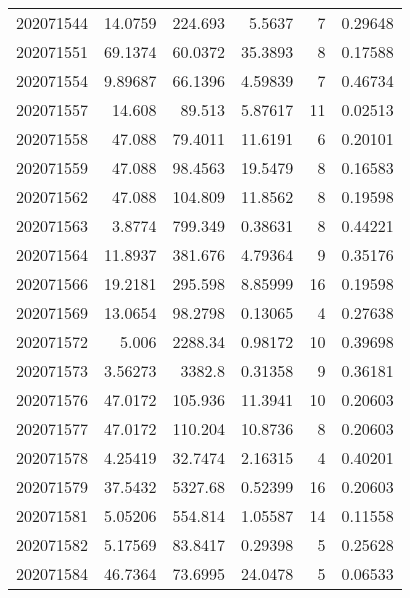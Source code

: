 \begin{tabular}{rrrrrr}
 202071544 &         14.0759  &      224.693  &            5.5637  &           7 & 0.29648 \\
 202071551 &         69.1374  &       60.0372 &           35.3893  &           8 & 0.17588 \\
 202071554 &          9.89687 &       66.1396 &            4.59839 &           7 & 0.46734 \\
 202071557 &         14.608   &       89.513  &            5.87617 &          11 & 0.02513 \\
 202071558 &         47.088   &       79.4011 &           11.6191  &           6 & 0.20101 \\
 202071559 &         47.088   &       98.4563 &           19.5479  &           8 & 0.16583 \\
 202071562 &         47.088   &      104.809  &           11.8562  &           8 & 0.19598 \\
 202071563 &          3.8774  &      799.349  &            0.38631 &           8 & 0.44221 \\
 202071564 &         11.8937  &      381.676  &            4.79364 &           9 & 0.35176 \\
 202071566 &         19.2181  &      295.598  &            8.85999 &          16 & 0.19598 \\
 202071569 &         13.0654  &       98.2798 &            0.13065 &           4 & 0.27638 \\
 202071572 &          5.006   &     2288.34   &            0.98172 &          10 & 0.39698 \\
 202071573 &          3.56273 &     3382.8    &            0.31358 &           9 & 0.36181 \\
 202071576 &         47.0172  &      105.936  &           11.3941  &          10 & 0.20603 \\
 202071577 &         47.0172  &      110.204  &           10.8736  &           8 & 0.20603 \\
 202071578 &          4.25419 &       32.7474 &            2.16315 &           4 & 0.40201 \\
 202071579 &         37.5432  &     5327.68   &            0.52399 &          16 & 0.20603 \\
 202071581 &          5.05206 &      554.814  &            1.05587 &          14 & 0.11558 \\
 202071582 &          5.17569 &       83.8417 &            0.29398 &           5 & 0.25628 \\
 202071584 &         46.7364  &       73.6995 &           24.0478  &           5 & 0.06533 \\

\end{tabular}

